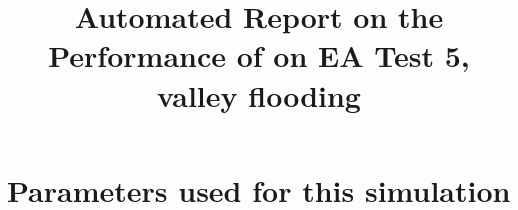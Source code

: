 \documentclass[11pt,a4paper]{article}%
\begin{document}
 

\title{Automated Report on the Performance of \anuga{} on EA Test 5, valley flooding}
\maketitle




\section{Parameters used for this simulation}






\end{document}
